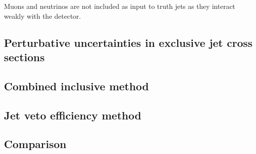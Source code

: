 
Muons and neutrinos are not included as input to truth jets as they interact weakly with the detector.

\subsection{Perturbative uncertainties in exclusive jet cross sections}
\subsection{Combined inclusive method}
\subsection{Jet veto efficiency method}
\subsection{Comparison}
